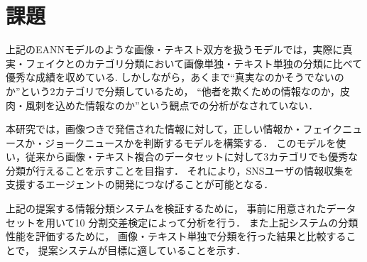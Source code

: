 \section{課題}
上記のEANNモデルのような画像・テキスト双方を扱うモデルでは，実際に真実・フェイクとのカテゴリ分類において画像単独・テキスト単独の分類に比べて優秀な成績を収めている\cite{eann}.\@
しかしながら，あくまで``真実なのかそうでないのか''という2カテゴリで分類しているため，
``他者を欺くための情報なのか，皮肉・風刺を込めた情報なのか''という観点での分析がなされていない．

本研究では，画像つきで発信された情報に対して，正しい情報か・フェイクニュースか・ジョークニュースかを判断するモデルを構築する．
このモデルを使い，従来から画像・テキスト複合のデータセットに対して3カテゴリでも優秀な分類が行えることを示すことを目指す．
それにより，SNSユーザの情報収集を支援するエージェントの開発につなげることが可能となる．

上記の提案する情報分類システムを検証するために，
事前に用意されたデータセットを用いて10 分割交差検定によって分析を行う．
また上記システムの分類性能を評価するために，
画像・テキスト単独で分類を行った結果と比較することで，
提案システムが目標に適していることを示す．

% 
